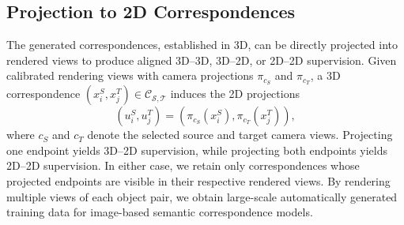 \subsection{Projection to 2D Correspondences}
\label{sec:projection_2d}

The generated correspondences, established in 3D, can be directly projected into rendered views to produce aligned 3D--3D, 3D--2D, or 2D--2D supervision. Given calibrated rendering views with camera projections \(\pi_{c_S}\) and \(\pi_{c_T}\), a 3D correspondence \((x_i^S,x_j^T)\in\mathcal{C}_{\mathcal{S},\mathcal{T}}\) induces the 2D projections
\begin{equation}
\label{eq:projection_to_2d}
(u_i^S,u_j^T)
=
\left(
\pi_{c_S}(x_i^S),
\pi_{c_T}(x_j^T)
\right),
\end{equation}
where \(c_S\) and \(c_T\) denote the selected source and target camera views.
Projecting one endpoint yields 3D--2D supervision, while projecting both endpoints yields 2D--2D supervision.
In either case, we retain only correspondences whose projected endpoints are visible in their respective rendered views.
By rendering multiple views of each object pair, we obtain large-scale automatically generated training data for image-based semantic correspondence models.

